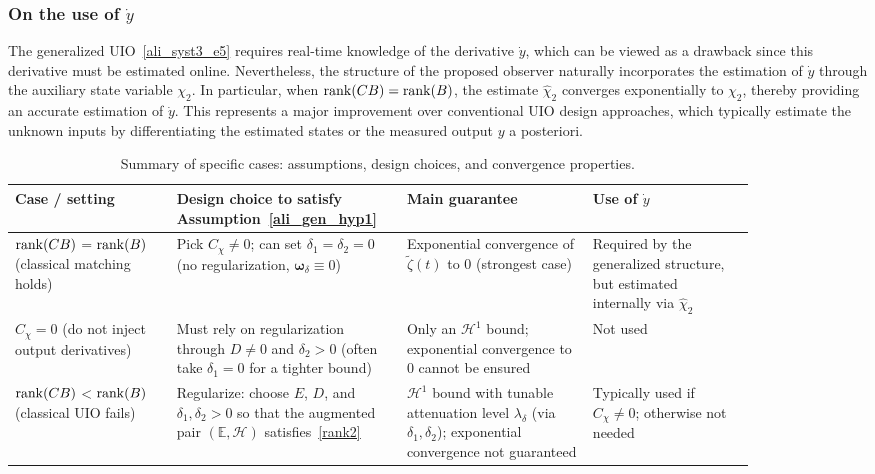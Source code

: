 \subsubsection{On the use of $\dot{y}$}
%
The generalized UIO~\eqref{ali_syst3_e5} requires real-time knowledge of the derivative $\dot{y}$, which can be viewed as a drawback since this derivative must be estimated online. Nevertheless, the structure of the proposed observer naturally incorporates the estimation of $\dot{y}$ through the auxiliary state variable $\chi_{2}$. In particular, when $\mathop{{\rm rank}}(CB) = \mathop{{\rm rank}}(B)$, the estimate $\hat{\chi}_{2}$ converges exponentially to $\chi_{2}$, thereby providing an accurate estimation of $\dot{y}$. This represents a major improvement over conventional UIO design approaches, which typically estimate the unknown inputs by differentiating the estimated states or the measured output $y$ a posteriori.


\begin{table}[ht!]
\centering
\renewcommand{\arraystretch}{1.1}
\caption{Summary of specific cases: assumptions, design choices, and convergence properties.}
\label{tab:uio_specific_cases_summary}
\begin{tabular}{|p{0.2\linewidth}|p{0.23\linewidth}|p{0.23\linewidth}|p{0.2\linewidth}|}
\hline
    \textbf{Case / setting} & \textbf{Design choice to satisfy Assumption~\ref{ali_gen_hyp1}} & \textbf{Main guarantee} & \textbf{Use of $\dot{y}$} \\
\hline
$\mathop{{\rm rank}}(CB)$$=$$\mathop{{\rm rank}}(B)$ (classical matching holds) & Pick $C_{\chi}\neq 0$; can set $\delta_{1}=\delta_{2}=0$ (no regularization, $\bm{\omega}_{\delta}\equiv 0$) & Exponential convergence of $\tilde{\zeta}(t)$ to $0$ (strongest case) & Required by the generalized structure, but estimated internally via $\hat{\chi}_{2}$ \\
\hline
$C_{\chi}=0$ (do not inject output derivatives) & Must rely on regularization through $D\neq 0$ and $\delta_{2}>0$ (often take $\delta_{1}=0$ for a tighter bound) & Only an $\mathcal{H}^{1}$ bound; exponential convergence to $0$ cannot be ensured & Not used \\
\hline
$\mathop{{\rm rank}}(CB)$$<$$\mathop{{\rm rank}}(B)$ (classical UIO fails) & Regularize: choose $E$, $D$, and $\delta_{1},\delta_{2}>0$ so that the augmented pair $(\mathbb{E},\mathcal{H})$ satisfies~\eqref{rank2} & $\mathcal{H}^{1}$ bound with tunable attenuation level $\lambda_{\delta}$ (via $\delta_{1},\delta_{2}$); exponential convergence not guaranteed & Typically used if $C_{\chi}\neq 0$; otherwise not needed \\
\hline
\end{tabular}
\end{table}

